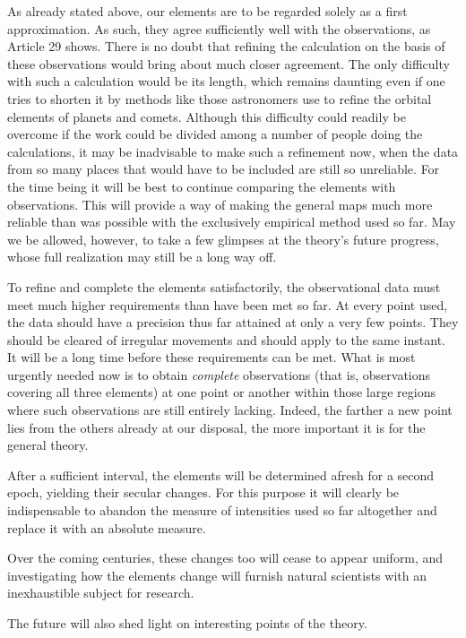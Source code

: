 As already stated above, our elements are to be regarded solely as a first approximation. As such, they agree sufficiently well with the observations, as Article 29 shows. There is no doubt that refining the calculation on the basis of these observations would bring about much closer agreement. The only difficulty with such a calculation would be its length, which remains daunting even if one tries to shorten it by methods like those astronomers use to refine the orbital elements of planets and comets. Although this difficulty could readily be
overcome if the work could be divided among a number of people doing the calculations, it may be inadvisable to make such a refinement now, when the data from so many places that would have to be included are still so unreliable. For the time being it will be best to continue comparing the elements with observations. This will provide a way of making the general maps much more reliable than was possible with the exclusively empirical method used so far. May we be allowed, however, to take a few glimpses at the theory's future progress, whose full realization may still be a long way off.

To refine and complete the elements satisfactorily, the observational data must meet much higher requirements than have been met so far. At every point used, the data should have a precision thus far attained at only a very few points. They should be cleared of irregular movements and should apply to the same instant. It will be a long time before these requirements can be met. What is most urgently needed now is to obtain \textit{complete} observations (that is, observations covering all three elements) at one point or another within those large regions where such observations are still entirely lacking. Indeed, the farther a new point lies from the others already at our disposal, the more important it is for the general theory.

After a sufficient interval, the elements will be determined afresh for a second epoch, yielding their secular changes. For this purpose it will clearly be indispensable to abandon the measure of intensities used so far altogether and replace it with an absolute measure.

Over the coming centuries, these changes too will cease to appear uniform, and investigating how the elements change will furnish natural scientists with an inexhaustible subject for research.

The future will also shed light on interesting points of the theory.

